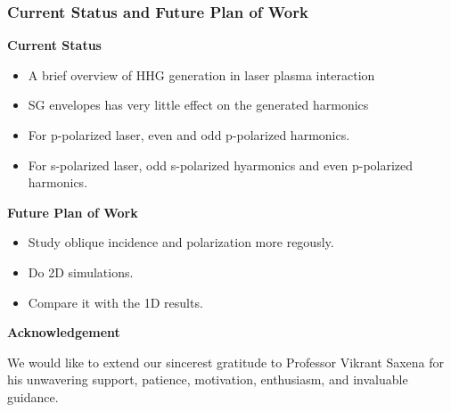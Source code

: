 \documentclass{beamer}
\begin{document}
\begin{frame}
    \frametitle{Current Status and Future Plan of Work}
    \small
    \textbf{Current Status}
    \begin{itemize}
        \item A brief overview of HHG generation in laser plasma interaction
        \item SG envelopes has very little effect on the generated harmonics
        \item For p-polarized laser, even and odd p-polarized harmonics.
        \item For s-polarized laser, odd s-polarized hyarmonics and even p-polarized harmonics.
    \end{itemize}
    \textbf{Future Plan of Work}
    \begin{itemize}
        \item Study oblique incidence and polarization more regously.
        \item Do 2D simulations.
        \item Compare it with the 1D results.
    \end{itemize}
    \textbf{Acknowledgement}

    We would like to extend our sincerest gratitude to Professor Vikrant Saxena for his unwavering support, patience, motivation, enthusiasm, and invaluable guidance.
\end{frame}
\end{document}
